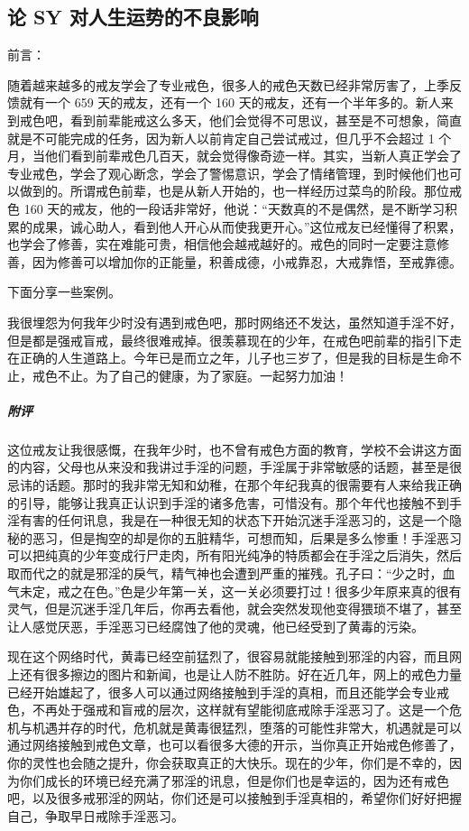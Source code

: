 \subsection{论 SY 对人生运势的不良影响}

前言：

随着越来越多的戒友学会了专业戒色，很多人的戒色天数已经非常厉害了，上季反馈就有一个 659 天的戒友，还有一个 160 天的戒友，还有一个半年多的。新人来到戒色吧，看到前辈能戒这么多天，他们会觉得不可思议，甚至是不可想象，简直就是不可能完成的任务，因为新人以前肯定自己尝试戒过，但几乎不会超过 1 个月，当他们看到前辈戒色几百天，就会觉得像奇迹一样。其实，当新人真正学会了专业戒色，学会了观心断念，学会了警惕意识，学会了情绪管理，到时候他们也可以做到的。所谓戒色前辈，也是从新人开始的，也一样经历过菜鸟的阶段。那位戒色 160 天的戒友，他的一段话非常好，他说：“天数真的不是偶然，是不断学习积累的成果，诚心助人，看到他人开心从而使我更开心。”这位戒友已经懂得了积累，也学会了修善，实在难能可贵，相信他会越戒越好的。戒色的同时一定要注意修善，因为修善可以增加你的正能量，积善成德，小戒靠忍，大戒靠悟，至戒靠德。

下面分享一些案例。

\begin{case}
    我很埋怨为何我年少时没有遇到戒色吧，那时网络还不发达，虽然知道手淫不好，但是都是强戒盲戒，最终很难戒掉。很羡慕现在的少年，在戒色吧前辈的指引下走在正确的人生道路上。今年已是而立之年，儿子也三岁了，但是我的目标是生命不止，戒色不止。为了自己的健康，为了家庭。一起努力加油！
    \subparagraph{附评} 这位戒友让我很感慨，在我年少时，也不曾有戒色方面的教育，学校不会讲这方面的内容，父母也从来没和我讲过手淫的问题，手淫属于非常敏感的话题，甚至是很忌讳的话题。那时的我非常无知和幼稚，在那个年纪我真的很需要有人来给我正确的引导，能够让我真正认识到手淫的诸多危害，可惜没有。那个年代也接触不到手淫有害的任何讯息，我是在一种很无知的状态下开始沉迷手淫恶习的，这是一个隐秘的恶习，但是掏空的却是你的五脏精华，可想而知，后果是多么惨重！手淫恶习可以把纯真的少年变成行尸走肉，所有阳光纯净的特质都会在手淫之后消失，然后取而代之的就是邪淫的戾气，精气神也会遭到严重的摧残。孔子曰：“少之时，血气未定，戒之在色。”色是少年第一关，这一关必须要打过！很多少年原来真的很有灵气，但是沉迷手淫几年后，你再去看他，就会突然发现他变得猥琐不堪了，甚至让人感觉厌恶，手淫恶习已经腐蚀了他的灵魂，他已经受到了黄毒的污染。

    现在这个网络时代，黄毒已经空前猛烈了，很容易就能接触到邪淫的内容，而且网上还有很多擦边的图片和新闻，也是让人防不胜防。好在近几年，网上的戒色力量已经开始雄起了，很多人可以通过网络接触到手淫的真相，而且还能学会专业戒色，不再处于强戒和盲戒的层次，这样就有望能彻底戒除手淫恶习了。这是一个危机与机遇并存的时代，危机就是黄毒很猛烈，堕落的可能性非常大，机遇就是可以通过网络接触到戒色文章，也可以看很多大德的开示，当你真正开始戒色修善了，你的灵性也会随之提升，你会获取真正的大快乐。现在的少年，你们是不幸的，因为你们成长的环境已经充满了邪淫的讯息，但是你们也是幸运的，因为还有戒色吧，以及很多戒邪淫的网站，你们还是可以接触到手淫真相的，希望你们好好把握自己，争取早日戒除手淫恶习。
\end{case}

